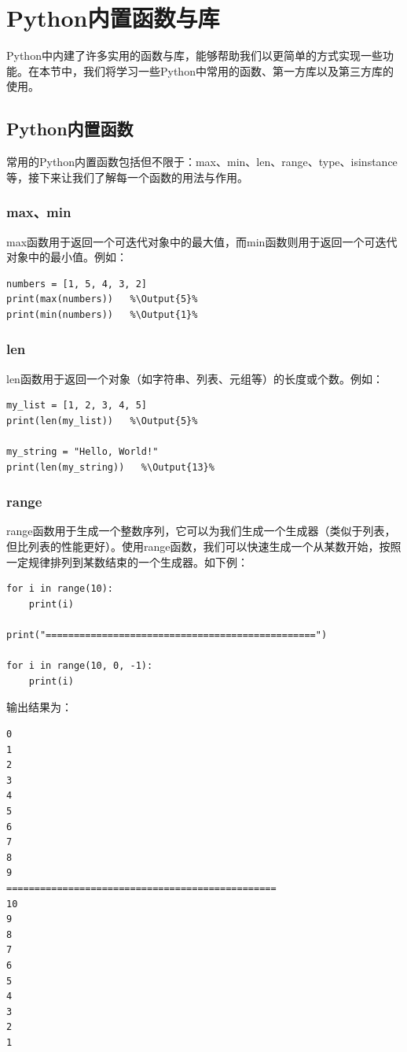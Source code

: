 \documentclass[../../Main.tex]{subfiles}
\begin{document}
\section{Python内置函数与库}
Python中内建了许多实用的函数与库，能够帮助我们以更简单的方式实现一些功能。在本节中，我们将学习一些Python中常用的函数、第一方库以及第三方库的使用。

\subsection{Python内置函数}
常用的Python内置函数包括但不限于：max、min、len、range、type、isinstance等，接下来让我们了解每一个函数的用法与作用。

\subsubsection{max、min}
max函数用于返回一个可迭代对象中的最大值，而min函数则用于返回一个可迭代对象中的最小值。例如：
\begin{lstlisting}
numbers = [1, 5, 4, 3, 2]
print(max(numbers))   %\Output{5}%
print(min(numbers))   %\Output{1}%
\end{lstlisting}

\subsubsection{len}
len函数用于返回一个对象（如字符串、列表、元组等）的长度或个数。例如：
\begin{lstlisting}
my_list = [1, 2, 3, 4, 5]
print(len(my_list))   %\Output{5}%

my_string = "Hello, World!"
print(len(my_string))   %\Output{13}%
\end{lstlisting}

\subsubsection{range}
range函数用于生成一个整数序列，它可以为我们生成一个生成器（类似于列表，但比列表的性能更好）。使用range函数，我们可以快速生成一个从某数开始，按照一定规律排列到某数结束的一个生成器。如下例：
\begin{lstlisting}
for i in range(10):
    print(i)

print("================================================")

for i in range(10, 0, -1):
    print(i)
\end{lstlisting}
输出结果为：
\begin{lstlisting}
0
1
2
3
4
5
6
7
8
9
================================================
10
9
8
7
6
5
4
3
2
1
\end{lstlisting}
\end{document}
